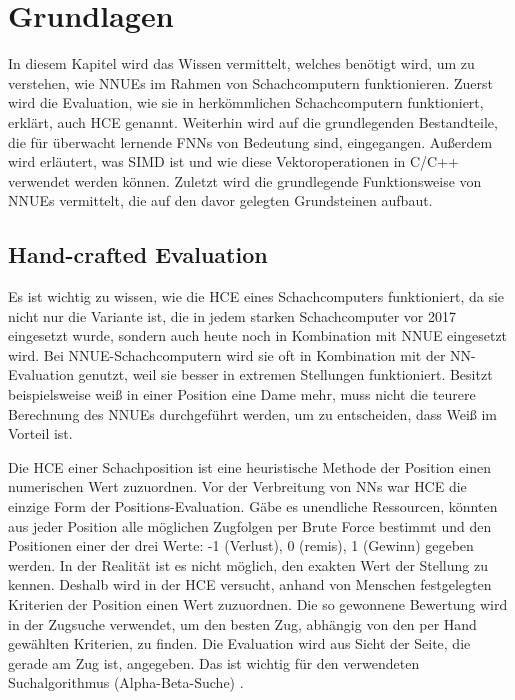 \chapter{Grundlagen}

In diesem Kapitel wird das Wissen vermittelt, welches benötigt wird, um zu verstehen, wie \acp{NNUE} im Rahmen von Schachcomputern funktionieren. Zuerst wird die Evaluation, wie sie in herkömmlichen Schachcomputern funktioniert, erklärt, auch \ac{HCE} genannt. Weiterhin wird auf die grundlegenden Bestandteile, die für überwacht lernende \acp{FNN} von Bedeutung sind, eingegangen. Außerdem wird erläutert, was \ac{SIMD} ist und wie diese Vektoroperationen in C/C++ verwendet werden können. Zuletzt wird die grundlegende Funktionsweise von \acp{NNUE} vermittelt, die auf den davor gelegten Grundsteinen aufbaut.

\section{Hand-crafted Evaluation}
\label{chap:HCE}

Es ist wichtig zu wissen, wie die \ac{HCE} eines Schachcomputers funktioniert, da sie nicht nur die Variante ist, die in jedem starken Schachcomputer vor 2017 eingesetzt wurde, sondern auch heute noch in Kombination mit \ac{NNUE} eingesetzt wird. Bei \ac{NNUE}-Schachcomputern wird sie oft in Kombination mit der \ac{NN}-Evaluation genutzt, weil sie besser in extremen Stellungen funktioniert. Besitzt beispielsweise weiß in einer Position eine Dame mehr, muss nicht die teurere Berechnung des \acp{NNUE} durchgeführt werden, um zu entscheiden, dass Weiß im Vorteil ist.

Die \ac{HCE} einer Schachposition ist eine heuristische Methode der Position einen numerischen Wert zuzuordnen. Vor der Verbreitung von \acp{NN} war \ac{HCE} die einzige Form der Positions-Evaluation. Gäbe es unendliche Ressourcen, könnten aus jeder Position alle möglichen Zugfolgen per Brute Force bestimmt und den Positionen einer der drei Werte: -1 (Verlust), 0 (remis), 1 (Gewinn) gegeben werden. In der Realität ist es nicht möglich, den exakten Wert der Stellung zu kennen. Deshalb wird in der \ac{HCE} versucht, anhand von Menschen festgelegten Kriterien der Position einen Wert zuzuordnen. Die so gewonnene Bewertung wird in der Zugsuche verwendet, um den besten Zug, abhängig von den per Hand gewählten Kriterien, zu finden. Die Evaluation wird aus Sicht der Seite, die gerade am Zug ist, angegeben. Das ist wichtig für den verwendeten Suchalgorithmus (Alpha-Beta-Suche) \cite{Slagle1969}.

